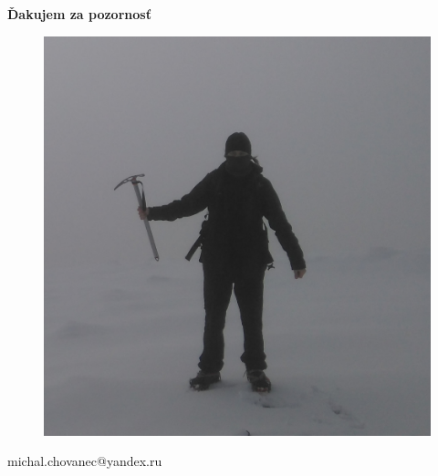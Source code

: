 \documentclass[xcolor=dvipsnames]{beamer}
\begin{document}
\begin{frame}{\bf Ďakujem za pozornosť}

\begin{figure}[!htb]
\centering
\includegraphics[scale=.15]{../pictures/me.jpg}
\end{figure}

\centerline{michal.chovanec@yandex.ru}

\end{frame}
\end{document}
